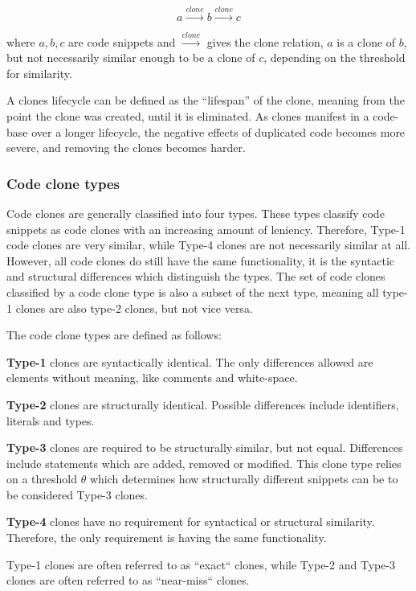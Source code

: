 \documentclass[12pt]{article}
\begin{document}
$$a \xrightarrow{clone} b \xrightarrow{clone} c$$

where $a,b,c$ are code snippets and $\xrightarrow{clone}$ gives the clone relation, $a$ is
a clone of $b$, but not necessarily similar enough to be a clone of $c$, depending on the
threshold for similarity.

A clones lifecycle can be defined as the ``lifespan'' of the clone, meaning from the point
the clone was created, until it is eliminated. As clones manifest in a code-base over a
longer lifecycle, the negative effects of duplicated code becomes more severe, and removing
the clones becomes harder.

\subsubsection{Code clone types}

Code clones are generally classified into four types\cite{Inoue_introduction_to_cc}. These
types classify code snippets as code clones with an increasing amount of leniency.
Therefore, Type-1 code clones are very similar, while Type-4 clones are not necessarily
similar at all. However, all code clones do still have the same functionality, it is the
syntactic and structural differences which distinguish the types. The set of code clones
classified by a code clone type is also a subset of the next type, meaning all type-1
clones are also type-2 clones, but not vice versa.

The code clone types are defined as follows:

\textbf{Type-1} clones are syntactically identical. The only differences allowed are elements
without meaning, like comments and white-space.

\textbf{Type-2} clones are structurally identical. Possible differences include
identifiers, literals and types.

\textbf{Type-3} clones are required to be structurally similar, but not equal. Differences
include statements which are added, removed or modified. This clone type relies on a
threshold $\theta$ which determines how structurally different snippets can be
to be considered Type-3 clones\cite{Inoue_introduction_to_cc}.

\textbf{Type-4} clones have no requirement for syntactical or structural similarity. Therefore,
the only requirement is having the same functionality.

Type-1 clones are often referred to as ``exact`` clones, while Type-2 and Type-3 clones are
often referred to as ``near-miss`` clones\cite[1]{Zibran_real_time_search}.
\end{document}

